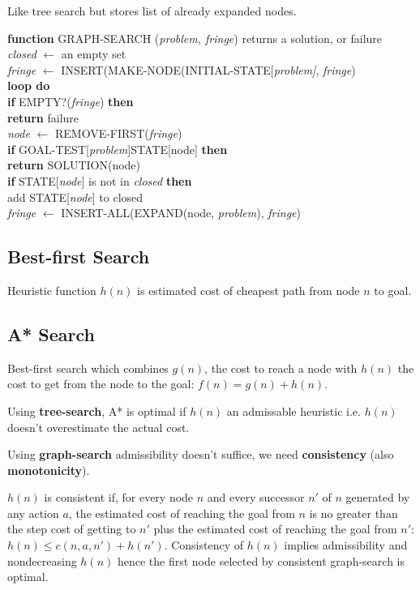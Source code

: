\begin{multicols}{4}
Like tree search but stores list of already expanded nodes.

\textbf{function} GRAPH-SEARCH (\textit{problem, fringe}) returns a solution, or failure\\
\textit{closed} $\leftarrow$ an empty set\\
\textit{fringe} $\leftarrow$ INSERT(MAKE-NODE(INITIAL-STATE[\textit{problem]}, \textit{fringe})\\
\textbf{loop do}\\
\textbf{if} EMPTY?(\textit{fringe}) \textbf{then}\\
    \textbf{return} failure\\
\textit{node} $\leftarrow$ REMOVE-FIRST(\textit{fringe})\\
\textbf{if} GOAL-TEST[\textit{problem}]STATE[node] \textbf{then}\\
    \textbf{return} SOLUTION(node)\\
\textbf{if} STATE[\textit{node}] is not in \textit{closed} \textbf{then}\\
    add STATE[\textit{node}] to closed\\
    \textit{fringe} $\leftarrow$ INSERT-ALL(EXPAND(node, \textit{problem}), \textit{fringe})\\

\subsection{Best-first Search}

Heuristic function $h(n)$ is estimated cost of cheapest path from node $n$ to goal.

\subsection{A* Search}

Best-first search which combines $g(n)$, the cost to reach a node with $h(n)$ the cost to get from the node to the goal: $f(n) = g(n) + h(n)$.

Using \textbf{tree-search}, A* is optimal if $h(n)$ an admissable heuristic i.e. $h(n)$ doesn't overestimate the actual cost.

Using \textbf{graph-search} admissibility doesn't suffice, we need \textbf{consistency} (also \textbf{monotonicity}).

$h(n)$ is consistent if, for every node $n$ and every successor $n'$ of $n$ generated by any action $a$, the estimated cost of reaching the goal from $n$ is no greater than the step cost of getting to $n'$ plus the estimated cost of reaching the goal from $n'$: $h(n) \leq c(n, a, n') + h(n')$. Consistency of $h(n)$ implies admissibility and nondecreasing $h(n)$ hence the first node selected by consistent graph-search is optimal.


\end{multicols}

